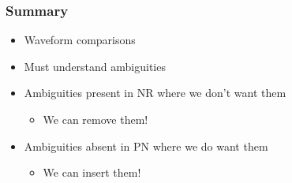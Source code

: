 \documentclass[12pt,xcolor={dvipsnames}]{beamer}
\begin{document}
\begin{frame}
  \frametitle{Summary}
  \begin{itemize}
  \item Waveform comparisons
  \item Must understand ambiguities
  \item Ambiguities present in NR where we don't want them
    \begin{itemize}
    \item We can remove them!
    \end{itemize}
  \item Ambiguities absent in PN where we do want them
    \begin{itemize}
    \item We can insert them!
    \end{itemize}
  \end{itemize}
\end{frame}
\end{document}
